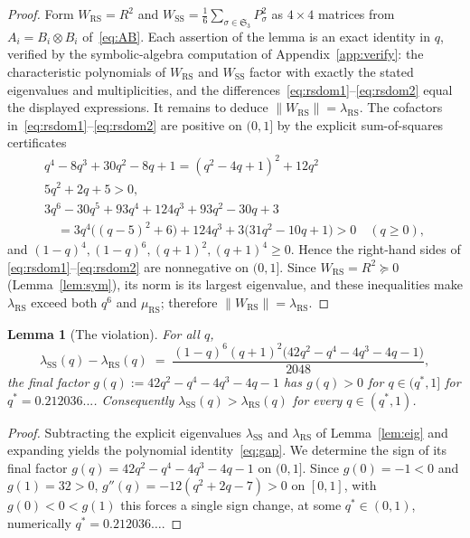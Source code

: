 \documentclass[11pt]{article}
\newtheorem{lemma}[theorem]{Lemma}
\theoremstyle{definition}
\theoremstyle{remark}
\newcommand{\norm}[1]{\left\lVert #1 \right\rVert}
\newcommand{\Wss}{W_{\mathrm{SS}}}
\newcommand{\Wrs}{W_{\mathrm{RS}}}
\newcommand{\psdge}{\succeq}
\begin{document}
\begin{proof}
Form $\Wrs=R^2$ and $\Wss=\frac16\sum_{\sigma\in\mathfrak S_3}P_\sigma^2$ as $4\times4$ matrices from
$A_i=B_i\otimes B_i$ of~\eqref{eq:AB}. Each assertion of the lemma is an exact identity in $q$,
verified by the symbolic-algebra computation of Appendix~\ref{app:verify}: the characteristic
polynomials of $\Wrs$ and $\Wss$ factor with exactly the stated eigenvalues and multiplicities, and the
differences~\eqref{eq:rsdom1}--\eqref{eq:rsdom2} equal the displayed expressions. It remains to deduce
$\norm{\Wrs}=\lambda_{\mathrm{RS}}$. The cofactors in~\eqref{eq:rsdom1}--\eqref{eq:rsdom2} are positive
on $(0,1]$ by the explicit sum-of-squares certificates
\begin{gather*}
q^4-8q^3+30q^2-8q+1=(q^2-4q+1)^2+12q^2\\
5q^2+2q+5>0,\\
3q^6-30q^5+93q^4+124q^3+93q^2-30q+3\\
\quad=3q^4\bigl((q-5)^2+6\bigr)+124q^3+3\bigl(31q^2-10q+1\bigr)>0\quad(q\ge0),
\end{gather*}
and
$(1-q)^4,(1-q)^6,(q+1)^2,(q+1)^4\ge0$. Hence the right-hand sides of
\eqref{eq:rsdom1}--\eqref{eq:rsdom2} are nonnegative on $(0,1]$. Since $\Wrs=R^2\psdge0$ (Lemma~\ref{lem:sym}), its norm is
its largest eigenvalue, and these inequalities make $\lambda_{\mathrm{RS}}$ exceed both $q^6$ and
$\mu_{\mathrm{RS}}$; therefore $\norm{\Wrs}=\lambda_{\mathrm{RS}}$.
\end{proof}

\begin{lemma}[The violation]\label{lem:gap}
For all $q$,
\begin{equation}\label{eq:gap}
\lambda_{\mathrm{SS}}(q)-\lambda_{\mathrm{RS}}(q)
\;=\;
\frac{(1-q)^6(q+1)^2\bigl(42q^2-q^4-4q^3-4q-1\bigr)}{2048},
\end{equation}
the final factor $g(q):=42q^2-q^4-4q^3-4q-1$
has $g(q)>0$ for $q\in(q^\ast,1]$ for $q^{\ast} = 0.212036...$. Consequently
$\lambda_{\mathrm{SS}}(q)>\lambda_{\mathrm{RS}}(q)$ for every $q\in(q^\ast,1)$.
\end{lemma}

\begin{proof}
Subtracting the explicit eigenvalues $\lambda_{\mathrm{SS}}$ and $\lambda_{\mathrm{RS}}$ of
Lemma~\ref{lem:eig} and expanding yields the polynomial identity~\eqref{eq:gap}. We determine the sign
of its final factor $g(q)=42q^2-q^4-4q^3-4q-1$ on $(0,1]$. Since $g(0)=-1<0$ and $g(1)=32>0$, $g''(q)=-12(q^2+2q-7)>0$ on $[0,1]$, with $g(0)<0<g(1)$ this forces a single sign change, at some $q^\ast\in(0,1)$, numerically $q^\ast=0.212036\ldots$.
\end{proof}
\end{document}
